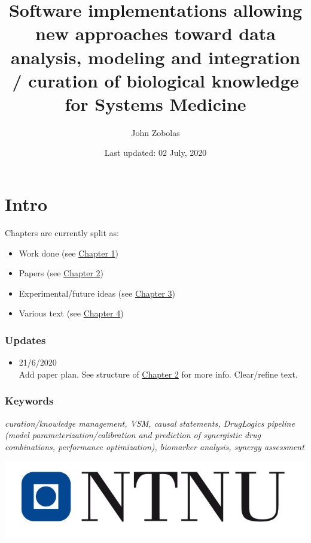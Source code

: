 \documentclass[
  12pt,
]{book}
\title{Software implementations allowing new approaches toward data analysis, modeling and integration / curation of biological knowledge for Systems Medicine}
\author{John Zobolas}
\date{Last updated: 02 July, 2020}
\providecommand{\tightlist}{%
  \setlength{\itemsep}{0pt}\setlength{\parskip}{0pt}}
\begin{document}
\maketitle

{
\hypersetup{linkcolor=}
\setcounter{tocdepth}{1}
\tableofcontents
}
\listoftables
\listoffigures
{}
\hypertarget{intro}{%
\chapter*{Intro}\label{intro}}

Chapters are currently split as:

\begin{itemize}
\tightlist
\item
  Work done (see \protect\hyperlink{phd-work}{Chapter 1})
\item
  Papers (see \protect\hyperlink{phd-papers}{Chapter 2})
\item
  Experimental/future ideas (see \protect\hyperlink{phd-ideas}{Chapter 3})
\item
  Various text (see \protect\hyperlink{text}{Chapter 4})
\end{itemize}

\hypertarget{updates}{%
\subsection*{Updates}\label{updates}}

\begin{itemize}
\tightlist
\item
  21/6/2020\\
  Add paper plan.
  See structure of \protect\hyperlink{phd-papers}{Chapter 2} for more info.
  Clear/refine text.
\end{itemize}

\hypertarget{keywords}{%
\subsection*{Keywords}\label{keywords}}

\emph{curation/knowledge management, VSM, causal statements, DrugLogics pipeline
(model parameterization/calibration and prediction of synergistic drug combinations, performance optimization), biomarker analysis, synergy assessment}

\begin{center}\includegraphics[width=0.5\linewidth]{img/NTNU-logo} \end{center}
\end{document}
